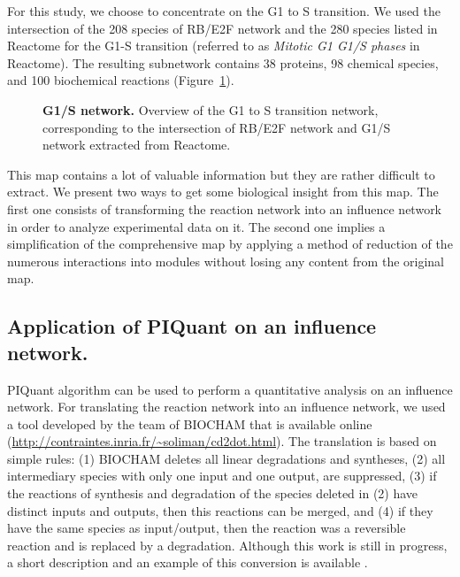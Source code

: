\documentclass[10pt]{bmc_article}
\newenvironment{bmcformat}{\baselineskip20pt\sloppy\setboolean{publ}{false}}{\baselineskip20pt\sloppy}
\begin{document}
\begin{bmcformat}
For this study, we choose to concentrate on the G1 to S transition. We
used the intersection of the 208 species
of RB/E2F network and the 280 species listed in Reactome \cite{joshi2005reactome} for the G1-S transition
(referred to as \emph{Mitotic G1 G1/S phases} in Reactome). The resulting
subnetwork contains 38 proteins, 98 chemical species, and 100 biochemical
reactions (Figure~\ref{g1s}).

\begin{figure}[h]
 \caption{\label{g1s}  \textbf{G1/S network.}
	Overview of the G1 to S transition network, corresponding to the intersection of
RB/E2F network and G1/S network extracted from Reactome.}
\end{figure}

This map contains a lot of valuable information but they are rather difficult to extract. We present two
ways to get some biological insight from this map. The first one consists of
transforming the reaction network into an influence network in order to analyze
experimental data on it. The second one implies a simplification of the comprehensive map by
applying a method of reduction of the numerous interactions into modules without
losing any content from the original map.

\subsection*{Application of PIQuant on an influence network.}
PIQuant algorithm can be used to perform a quantitative analysis on an influence
network. For translating the reaction network into an influence network, we used
a tool developed by the team of BIOCHAM \cite{calzone2006biocham} that is
available online (\url{http://contraintes.inria.fr/~soliman/cd2dot.html}). The
translation is based on simple rules: (1) BIOCHAM deletes all linear
degradations and syntheses, (2) all intermediary species with only one input and
one output, are suppressed, (3) if the reactions of synthesis and degradation of
the species deleted in (2) have distinct inputs and outputs, then this reactions
can be merged, and (4) if they have the same species as input/output, then the reaction was a
reversible reaction and is replaced by a degradation. Although this work is
still in progress, a short description and an example of this conversion is
available \cite{calzone2011calamar}. 


\end{bmcformat}
\end{document}

